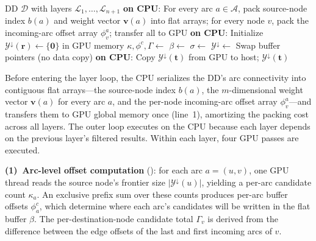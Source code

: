 \documentclass[letterpaper]{article}
\begin{document}
\begin{algorithm}[tbp!]
\caption{GPU-Accelerated Top-Down Pareto Frontier Enumeration}
\label{alg:gpu_top_down_pf}
\begin{algorithmic}[1]
\Require DD $\mathcal{D}$ with layers $\mathcal{L}_1,\dots,\mathcal{L}_{n+1}$
\State \textbf{on CPU}: For every arc $a \in \mathcal{A}$, pack source-node index $b(a)$ and weight vector $\mathbf{v}(a)$ into flat arrays; for every node $v$, pack the incoming-arc offset array $\phi^a_v$; transfer all to GPU 
\State \textbf{on CPU}: Initialize $\mathcal{Y}^{\downarrow}(\mathbf{r}) \gets \{\mathbf{0}\}$ in GPU memory
    \State $\kappa, \phi^c, \Gamma \gets$ 
    \State $\beta \gets$ 
    \State $\sigma \gets$ 
    \State $\mathcal{Y}^{\downarrow} \gets$ 
    \State Swap buffer pointers (no data copy)
\EndFor
\State \textbf{on CPU}: Copy $\mathcal{Y}^{\downarrow}(\mathbf{t})$ from GPU to host; \Return $\mathcal{Y}^{\downarrow}(\mathbf{t})$
\end{algorithmic}
\end{algorithm}

Before entering the layer loop, the CPU serializes the DD's arc connectivity into contiguous flat arrays---the source-node index $b(a)$, the $m$-dimensional weight vector $\mathbf{v}(a)$ for every arc $a$, and the per-node incoming-arc offset array $\phi^a_v$---and transfers them to GPU global memory once (line~1), amortizing the packing cost across all layers. The outer loop executes on the CPU because each layer depends on the previous layer's filtered results. Within each layer, four GPU passes are executed.

\textbf{(1)~Arc-level offset computation} (): for each arc $a = (u,v)$, one GPU thread reads the source node's frontier size $|\mathcal{Y}^{\downarrow}(u)|$, yielding a per-arc candidate count $\kappa_a$. An exclusive prefix sum over these counts produces per-arc buffer offsets $\phi^c_a$, which determine where each arc's candidates will be written in the flat buffer $\beta$. The per-destination-node candidate total $\Gamma_v$ is derived from the difference between the edge offsets of the last and first incoming arcs of $v$.
\end{document}
